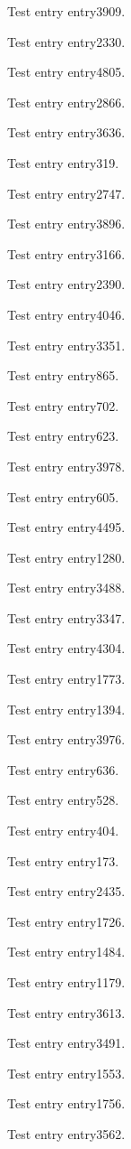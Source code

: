 Test entry \gls{entry3909}.

Test entry \gls{entry2330}.

Test entry \gls{entry4805}.

Test entry \gls{entry2866}.

Test entry \gls{entry3636}.

Test entry \gls{entry319}.

Test entry \gls{entry2747}.

Test entry \gls{entry3896}.

Test entry \gls{entry3166}.

Test entry \gls{entry2390}.

Test entry \gls{entry4046}.

Test entry \gls{entry3351}.

Test entry \gls{entry865}.

Test entry \gls{entry702}.

Test entry \gls{entry623}.

Test entry \gls{entry3978}.

Test entry \gls{entry605}.

Test entry \gls{entry4495}.

Test entry \gls{entry1280}.

Test entry \gls{entry3488}.

Test entry \gls{entry3347}.

Test entry \gls{entry4304}.

Test entry \gls{entry1773}.

Test entry \gls{entry1394}.

Test entry \gls{entry3976}.

Test entry \gls{entry636}.

Test entry \gls{entry528}.

Test entry \gls{entry404}.

Test entry \gls{entry173}.

Test entry \gls{entry2435}.

Test entry \gls{entry1726}.

Test entry \gls{entry1484}.

Test entry \gls{entry1179}.

Test entry \gls{entry3613}.

Test entry \gls{entry3491}.

Test entry \gls{entry1553}.

Test entry \gls{entry1756}.

Test entry \gls{entry3562}.

